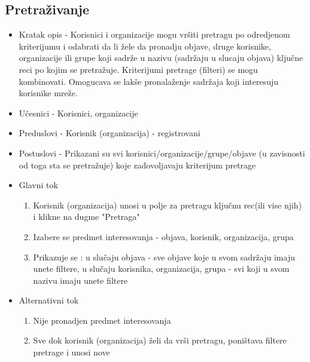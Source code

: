 \subsection{Pretraživanje}
\begin{itemize}
\item Kratak opis - Korisnici i organizacije mogu vršiti pretragu po odredjenom kriterijumu i odabrati da li žele da pronadju objave, druge korisnike, organizacije ili grupe koji sadrže u nazivu (sadržaju u slucaju objava) ključne reci po kojim se pretražuje. Kriterijumi pretrage (filteri) se mogu kombinovati. Omogucava se lakše pronalaženje sadržaja koji interesuju korisnike mreže.
\item Učesnici - Korisnici, organizacije
\item Preduslovi - Korisnik (organizacija) - registrovani
\item Postuslovi - Prikazani su svi korisnici/organizacije/grupe/objave (u zavisnosti od toga sta se pretražuje) koje zadovoljavaju kriterijum pretrage 
\item Glavni tok
	\begin{enumerate}
	\item Korisnik (organizacija) unosi u polje za pretragu ključnu rec(ili vise njih) i klikne na dugme "Pretraga"
	\item Izabere se predmet interesovanja - objava, korisnik, organizacija, grupa
	\item Prikazuje se : u slučaju objava - sve objave koje u svom sadržaju imaju unete filtere, u slučaju korisnika, organizacija, grupa - svi koji u svom nazivu imaju unete filtere
	\end{enumerate}
\item Alternativni tok
	\begin{enumerate}
	\item Nije pronadjen predmet interesovanja
	\item Sve dok korisnik (organizacija) želi da vrši pretragu, poništava filtere pretrage i unosi nove 
	\end{enumerate}
\end{itemize}


